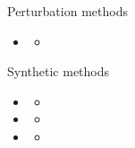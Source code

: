 \documentclass[
  ignorenonframetext,
  aspectratio=169,
]{beamer}
\begin{document}
\begin{frame}{Perturbation methods}
\protect\hypertarget{perturbation-methods}{}
\begin{itemize}
\item
  \begin{itemize}
  \item
    \color{red}{sdcMicro}
  \end{itemize}
\end{itemize}
\end{frame}

\begin{frame}{Synthetic methods}
\protect\hypertarget{synthetic-methods}{}
\begin{itemize}
\item
  \begin{itemize}
  \item
    \color{red}{synthpop}
  \end{itemize}
\item
  \begin{itemize}
  \item
    \color{red}{simPop}
  \end{itemize}
\item
  \begin{itemize}
  \item
    \color{red}{GANs}
  \end{itemize}
\end{itemize}
\end{frame}
\end{document}
